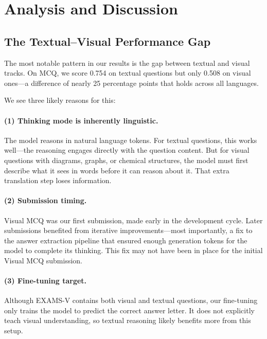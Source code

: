 \documentclass[]{ceurart}
\begin{document}
\section{Analysis and Discussion}
\label{sec:analysis}

\subsection{The Textual--Visual Performance Gap}
\label{sec:gap}

The most notable pattern in our results is the gap between textual and visual tracks.
On MCQ, we score 0.754 on textual questions but only 0.508 on visual ones---a difference of nearly 25 percentage points that holds across all languages.

We see three likely reasons for this:

\paragraph{(1) Thinking mode is inherently linguistic.}
The model reasons in natural language tokens.
For textual questions, this works well---the reasoning engages directly with the question content.
But for visual questions with diagrams, graphs, or chemical structures, the model must first describe what it sees in words before it can reason about it.
That extra translation step loses information.

\paragraph{(2) Submission timing.}
Visual MCQ was our first submission, made early in the development cycle.
Later submissions benefited from iterative improvements---most importantly, a fix to the answer extraction pipeline that ensured enough generation tokens for the model to complete its thinking.
This fix may not have been in place for the initial Visual MCQ submission.

\paragraph{(3) Fine-tuning target.}
Although EXAMS-V contains both visual and textual questions, our fine-tuning only trains the model to predict the correct answer letter.
It does not explicitly teach visual understanding, so textual reasoning likely benefits more from this setup.
\end{document}
